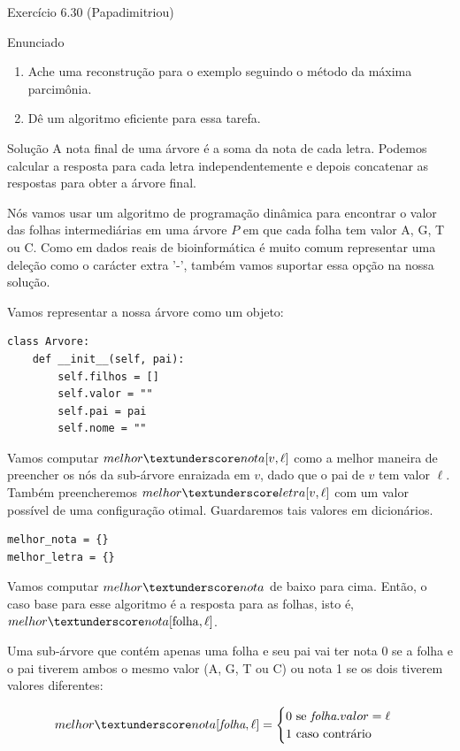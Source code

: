 \documentclass[presentation]{beamer}
\newcommand{\tu}{\textunderscore}
\begin{document}
\begin{frame}[fragile,label=sec-4]{Exercício 6.30 (Papadimitriou)}
\begin{block}{Enunciado}
\begin{enumerate}
\item Ache uma reconstrução para o exemplo seguindo o método da
máxima parcimônia.
\item Dê um algoritmo eficiente para essa tarefa.
\end{enumerate}
\end{block}

\begin{block}{Solução}
A nota final de uma árvore é a soma da nota de cada letra. Podemos
calcular a resposta para cada letra independentemente e depois
concatenar as respostas para obter a árvore final.

Nós vamos usar um algoritmo de programação dinâmica para encontrar o
valor das folhas intermediárias em uma árvore $P$ em que cada folha
tem valor A, G, T ou C. Como em dados reais de bioinformática é muito
comum representar uma deleção como o carácter extra '-', também vamos
suportar essa opção na nossa solução.

Vamos representar a nossa árvore como um objeto:
\begin{verbatim}
class Arvore:
    def __init__(self, pai):
        self.filhos = []
        self.valor = ""
        self.pai = pai
        self.nome = ""
\end{verbatim}

Vamos computar $melhor\tu nota[v, \ell]$ como a melhor maneira de
preencher os nós da sub-árvore enraizada em $v$, dado que o pai de $v$
tem valor $\ell$. Também preencheremos $melhor \tu letra[v, \ell]$ com um valor possível
de uma configuração otimal. Guardaremos tais valores em dicionários.

\begin{verbatim}
melhor_nota = {}
melhor_letra = {}
\end{verbatim}

Vamos computar $melhor \tu nota$ de baixo para cima. Então, o caso base
para esse algoritmo é a resposta para as folhas, isto é, $melhor\tu nota[\mathrm{folha}, \ell]$.

Uma sub-árvore que contém apenas uma folha e seu pai vai ter
nota 0 se a folha e o pai tiverem ambos o mesmo valor (A,
G, T ou C) ou nota 1 se os dois tiverem valores diferentes:

\[melhor \tu nota[\textit{folha}, \ell] = \begin{cases}0 \text{ se } \textit{folha}.valor = \ell \\
                                                       1 \text{ caso contrário}\end{cases}\]


\end{block}
\end{frame}
\end{document}

